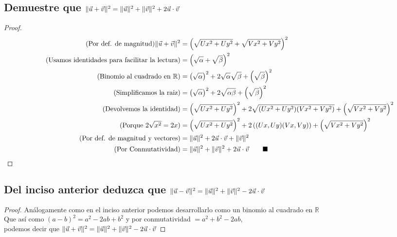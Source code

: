 \documentclass[14pt]{extarticle}
\DeclarePairedDelimiter\norm{\lVert}{\rVert}%
\begin{document}
\section{}
    \subsection{Demuestre que $\norm{\vec{u}+\vec{v}}^2 = \norm{\vec{u}}^2 + \norm{\vec{v}}^2 + 2\vec{u}\cdot\vec{v}$}
    \begin{proof}
    \begin{align}
        \tag{Por def. de magnitud} \norm{\vec{u}+\vec{v}}^2 &= \left(\sqrt{Ux^2+Uy^2}+\sqrt{Vx^2+Vy^2}\right)^2 \\
        \tag{Usamos identidades para facilitar la lectura}&= \left(\sqrt{\alpha} + \sqrt{\beta}\right)^2 \\
        \tag{Binomio al cuadrado en $\mathbb{R}$} &= \left(\sqrt{\alpha}\right)^2 + 2\sqrt{\alpha}\sqrt{\beta}+\left(\sqrt{\beta}\right)^2 \\
        \tag{Simplificamos la raiz} &= \left(\sqrt{\alpha}\right)^2 + 2\sqrt{\alpha\beta}+\left(\sqrt{\beta}\right)^2 \\
        \tag{Devolvemos la identidad} &= \left(\sqrt{Ux^2+Uy^2}\right)^2 + 2\sqrt{(Ux^2+Uy^2)(Vx^2+Vy^2)}+\left(\sqrt{Vx^2+Vy^2}\right)^2 \\
        \tag{Porque $2\sqrt{x^2} = 2x$} &= \left(\sqrt{Ux^2+Uy^2}\right)^2 + 2\left((Ux,Uy)(Vx,Vy)\right)+\left(\sqrt{Vx^2+Vy^2}\right)^2 \\
        \tag{Por def. de magnitud y vectores} &= \norm{\vec{u}}^2 + 2\vec{u}\cdot\vec{v} + \norm{\vec{v}}^2 \\
        \tag{Por Conmutatividad} &= \norm{\vec{u}}^2 + \norm{\vec{v}}^2 + 2\vec{u}\cdot\vec{v} \qquad \blacksquare
    \end{align}
    \end{proof}
    \subsection{Del inciso anterior deduzca que $\norm{\vec{u}-\vec{v}}^2 = \norm{\vec{u}}^2 + \norm{\vec{v}}^2 -2\vec{u}\cdot\vec{v}$}
        \begin{proof}
            Análogamente como en el inciso anterior podemos desarrollarlo como un binomio al cuadrado en $\mathbb{R}$ \\
            Que así como $(a-b)^2 = a^2 -2ab + b^2$ y por conmutatividad $ = a^2 + b^2-2ab$, \\
            podemos decir que $\norm{\vec{u}+\vec{v}}^2 = \norm{\vec{u}}^2 + \norm{\vec{v}}^2 -2\vec{u}\cdot\vec{v}$
        \end{proof}
\end{document}
